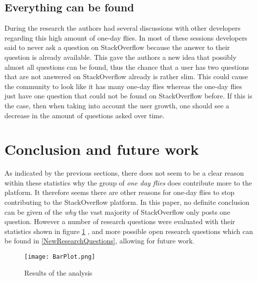 \documentclass[conference]{IEEEtran}
\begin{document}
\subsection{Everything can be found}
During the research the authors had several discussions with other developers
regarding this high amount of one-day flies. In most of these sessions
developers said to never ask a question on StackOverflow because the answer to
their question is already available. This gave the authors a new idea that
possibly almost all questions can be found, thus the chance that a user has two
questions that are not answered on StackOverflow already is rather slim. This
could cause the community to look like it has many one-day flies whereas the
one-day flies just have one question that could not be found on StackOverflow
before. If this is the case, then when taking into account the user growth, one
should see a decrease in the amount of questions asked over time. 

\section{Conclusion and future work}

As indicated by the previous sections, there does not seem to be a clear reason
within these statistics why the group of \textit{one day flies} does contribute
more to the platform. It therefore seems there are other reasons for one-day
flies to stop contributing to the StackOverflow platform. In this paper, no
definite conclusion can be given of the \textit{why} the vast majority of
StackOverflow only posts one question. However a number of research questions
were evaluated with their statistics shown in figure \ref{finalResults} , and
more possible open research questions which can be found in
\ref{NewResearchQuestions}, allowing for future work.

\begin{figure}[h]
 \texttt{[image: BarPlot.png]}
 \caption{Results of the analysis}
 \label{finalResults}
\end{figure}





\end{document}
